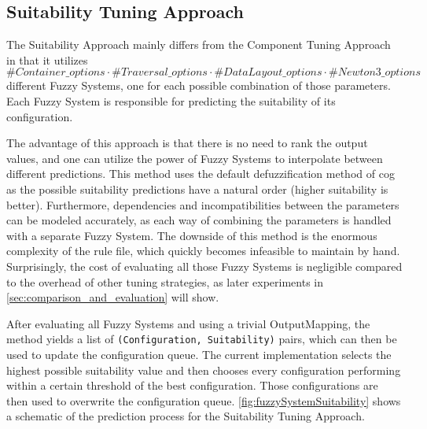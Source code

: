 \subsection{Suitability Tuning Approach}

The Suitability Approach mainly differs from the Component Tuning Approach in that it utilizes $\#Container\_options \cdot \#Traversal\_options \cdot \#DataLayout\_options \cdot \#Newton3\_options$ different Fuzzy Systems, one for each possible combination of those parameters. Each Fuzzy System is responsible for predicting the suitability of its configuration.

The advantage of this approach is that there is no need to rank the output values, and one can utilize the power of Fuzzy Systems to interpolate between different predictions. This method uses the default defuzzification method of \gls{cog} as the possible suitability predictions have a natural order (higher suitability is better). Furthermore, dependencies and incompatibilities between the parameters can be modeled accurately, as each way of combining the parameters is handled with a separate Fuzzy System. The downside of this method is the enormous complexity of the rule file, which quickly becomes infeasible to maintain by hand. Surprisingly, the cost of evaluating all those Fuzzy Systems is negligible compared to the overhead of other tuning strategies, as later experiments in \autoref{sec:comparison_and_evaluation} will show.


After evaluating all Fuzzy Systems and using a trivial OutputMapping, the method yields a list of \texttt{(Configuration, Suitability)} pairs, which can then be used to update the configuration queue. The current implementation selects the highest possible suitability value and then chooses every configuration performing within a certain threshold of the best configuration. Those configurations are then used to overwrite the configuration queue. \autoref{fig:fuzzySystemSuitability} shows a schematic of the prediction process for the Suitability Tuning Approach.

